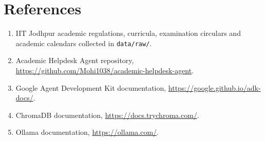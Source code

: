 \documentclass[11pt,a4paper]{article}
\begin{document}
\section{References}
\sloppy
\begin{enumerate}[leftmargin=*]
  \item IIT Jodhpur academic regulations, curricula, examination circulars and academic calendars collected in \texttt{data/raw/}.
  \item Academic Helpdesk Agent repository, \url{https://github.com/Mohi1038/academic-helpdesk-agent}.
  \item Google Agent Development Kit documentation, \url{https://google.github.io/adk-docs/}.
  \item ChromaDB documentation, \url{https://docs.trychroma.com/}.
  \item Ollama documentation, \url{https://ollama.com/}.
\end{enumerate}
\end{document}
